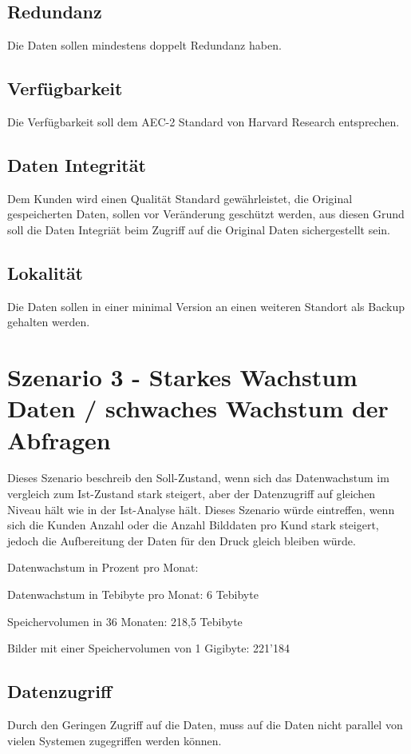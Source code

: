 \subsection{Redundanz}
Die Daten sollen mindestens doppelt Redundanz haben.

\subsection{Verfügbarkeit}
Die Verfügbarkeit soll dem AEC-2 Standard von Harvard Research entsprechen.

\subsection{Daten Integrität}
Dem Kunden wird einen Qualität Standard gewährleistet, die Original gespeicherten Daten, sollen vor Veränderung geschützt werden, aus diesen Grund soll die Daten Integriät beim Zugriff auf die Original Daten sichergestellt sein.

\subsection{Lokalität}
Die Daten sollen in einer minimal Version an einen weiteren Standort als Backup gehalten werden.

\section{Szenario 3 - Starkes Wachstum Daten / schwaches Wachstum der Abfragen}
Dieses Szenario beschreib den Soll-Zustand, wenn sich das Datenwachstum im vergleich zum Ist-Zustand stark steigert, aber der Datenzugriff auf gleichen Niveau hält wie in der Ist-Analyse hält. Dieses Szenario würde eintreffen, wenn sich die Kunden Anzahl oder die Anzahl Bilddaten pro Kund stark steigert, jedoch die Aufbereitung der Daten für den Druck gleich bleiben würde.

Datenwachstum in Prozent pro Monat: 

Datenwachstum in Tebibyte pro Monat: 6 Tebibyte

Speichervolumen in 36 Monaten: 218,5 Tebibyte

Bilder mit einer Speichervolumen von 1 Gigibyte: 221'184

\subsection{Datenzugriff}
Durch den Geringen Zugriff auf die Daten, muss auf die Daten nicht parallel von vielen Systemen zugegriffen werden können.

